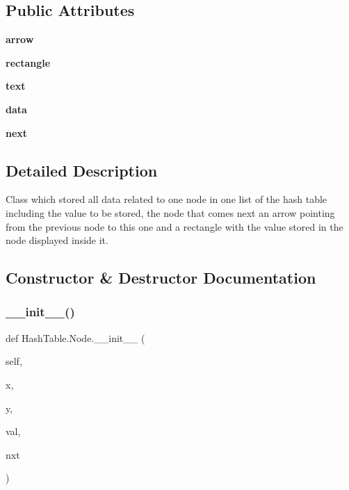 \subsection*{Public Attributes}
\begin{DoxyCompactItemize}
\item 
\mbox{\label{class_hash_table_1_1_node_a3f91972e1143a4748b526bb5570856f7}} 
{\bfseries arrow}
\item 
\mbox{\label{class_hash_table_1_1_node_a73ffdb3a86bf302ded6aba74cbc01473}} 
{\bfseries rectangle}
\item 
\mbox{\label{class_hash_table_1_1_node_a0af917d73b04e760b355bb490ff83557}} 
{\bfseries text}
\item 
\mbox{\label{class_hash_table_1_1_node_a237c28e82c0a4e9319e0891ca952047b}} 
{\bfseries data}
\item 
\mbox{\label{class_hash_table_1_1_node_af4974a35d52ac27d9e98348fb9a09545}} 
{\bfseries next}
\end{DoxyCompactItemize}


\subsection{Detailed Description}
Class which stored all data related to one node in one list of the hash table including the value to be stored, the node that comes next an arrow pointing from the previous node to this one and a rectangle with the value stored in the node displayed inside it. 

\subsection{Constructor \& Destructor Documentation}
\mbox{\label{class_hash_table_1_1_node_a7ff8b9136684e4b25aa1f3db517558c8}} 
\subsubsection{\texorpdfstring{\+\_\+\+\_\+init\+\_\+\+\_\+()}{\_\_init\_\_()}}
{\footnotesize\ttfamily def Hash\+Table.\+Node.\+\_\+\+\_\+init\+\_\+\+\_\+ (\begin{DoxyParamCaption}\item[{}]{self,  }\item[{}]{x,  }\item[{}]{y,  }\item[{}]{val,  }\item[{}]{nxt }\end{DoxyParamCaption})}



